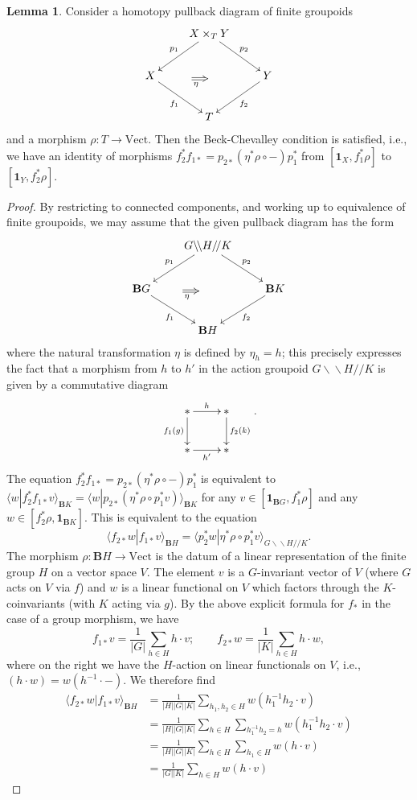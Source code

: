 \documentclass[12pt]{scrartcl}
\theoremstyle{definition}
\newtheorem{lemma}[definition]{Lemma}
\numberwithin{equation}{section}
\numberwithin{definition}{section}
\numberwithin{figure}{section}
\begin{document}
\begin{lemma}
Consider a homotopy pullback diagram of finite groupoids
\[
\xymatrix{
& X\times_TY\ar[dl]_{p_1}\ar[dr]^{p_2}\\
X\ar[dr]_{f_1}&& Y\ar[dl]^{f_2}
\\& T
\ar@{=>}_{\eta\phantom{m}}(13,-14);(18,-14)
}
\]
and a morphism $\rho\colon T\to \mathrm{Vect}$.
Then the Beck-Chevalley condition is satisfied, i.e., we have an identity of morphisms $f_2^*f_{1*}=p_{2*}(\eta^*\rho\circ-)p_1^*$ from $[\mathbf{1}_X,f_1^*\rho]$ to $[\mathbf{1}_Y,f_2^*\rho]$.
\end{lemma}
\begin{proof}
By restricting to connected components, and working up to equivalence of finite groupoids, we may assume that the given pullback diagram has the form
\[
\xymatrix{
& G\backslash\!\backslash H/\!/K\ar[dl]_{p_1}\ar[dr]^{p_2}\\
\mathbf{B}G\ar[dr]_{f_1}&& \mathbf{B}K\ar[dl]^{f_2}
\\& \mathbf{B}H
\ar@{=>}_{\eta\phantom{m}}(13,-14);(18,-14)
}
\]
where the natural transformation $\eta$ is defined by $\eta_h=h$; this precisely expresses the fact that a morphism from $h$ to $h'$ in the action groupoid  $G\backslash\!\backslash H/\!/K$ is given by a commutative diagram
\[
\xymatrix{
\ast\ar[r]^{h}\ar[d]_{f_1(g)}&\ast\ar[d]^{f_2(k)}\\
\ast\ar[r]_{h'}&\ast
}.
\]
The equation $f_2^*f_{1*}=p_{2*}(\eta^*\rho\circ-)p_1^*$ is equivalent to $\langle w| f_2^*f_{1*}v\rangle_{\mathbf{B}K} = \langle w|p_{2*}(\eta^*\rho\circ p_1^*v)\rangle_{\mathbf{B}K}$ for any $v\in [\mathbf{1}_{\mathbf{B}G},f_1^*\rho]$ and any $w\in [f_2^*\rho,\mathbf{1}_{\mathbf{B}K}]$. This is equivalent to the equation
\[
\langle f_{2*}w| f_{1*}v\rangle_{\mathbf{B}H} = \langle p_2^*w|\eta^*\rho\circ p_1^*v\rangle_{G\backslash\!\backslash H/\!/K}.
\]
The morphism $\rho\colon \mathbf{B}H\to \mathrm{Vect}$ is the datum of a linear representation of the finite group $H$ on a vector space $V$. The element $v$ is a $G$-invariant vector of $V$ (where $G$ acts on $V$ via $f$) and $w$ is a linear functional on $V$ which factors through the $K$-coinvariants (with $K$ acting via $g$). By the above explicit formula for $f_*$ in the case of a group morphism, we have
\[
f_{1*}v=\frac{1}{|G|}\sum_{h\in H} h\cdot v;\qquad f_{2*}w=\frac{1}{|K|}\sum_{h\in H} h\cdot w,
\]
where on the right we have the $H$-action on linear functionals on $V$, i.e., $(h\cdot w)= w(h^{-1}\cdot -)$. We therefore find
\begin{align*}
\langle f_{2*}w| f_{1*}v\rangle_{\mathbf{B}H}&=\frac{1}{|H||G||K|}\sum_{h_1,h_2\in H}w(h_1^{-1}h_2\cdot v)\\
&=\frac{1}{|H||G||K|}\sum_{h\in H}\sum_{h_1^{-1}h_2=h}w(h_1^{-1}h_2\cdot v)\\
&=\frac{1}{|H||G||K|}\sum_{h\in H}\sum_{h_1\in H}w(h\cdot v)\\
&=\frac{1}{|G||K|}\sum_{h\in H}w(h\cdot v)
\end{align*}


\end{proof}
\end{document}
